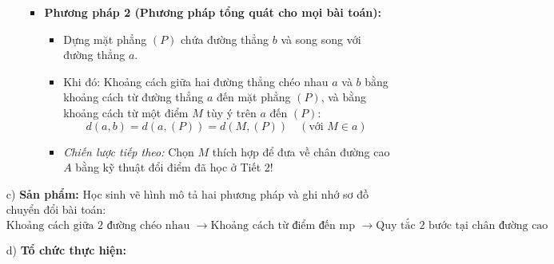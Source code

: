 \documentclass[12pt, a4paper]{article}
\begin{document}
\begin{itemize}[leftmargin=1.2cm]
\begin{itemize}[leftmargin=0.6cm]
\begin{itemize}
            \item \textbf{Phương pháp 2 (Phương pháp tổng quát cho mọi bài toán):}
            \begin{itemize}
                \item Dựng mặt phẳng $(P)$ chứa đường thẳng $b$ và song song với đường thẳng $a$.
                \item Khi đó: Khoảng cách giữa hai đường thẳng chéo nhau $a$ và $b$ bằng khoảng cách từ đường thẳng $a$ đến mặt phẳng $(P)$, và bằng khoảng cách từ một điểm $M$ tùy ý trên $a$ đến $(P)$:
                $$d(a, b) = d(a, (P)) = d(M, (P)) \quad (\text{với } M \in a)$$
                \item \textit{Chiến lược tiếp theo:} Chọn $M$ thích hợp để đưa về chân đường cao $A$ bằng kỹ thuật đổi điểm đã học ở Tiết 2!
            \end{itemize}
        \end{itemize}
    \end{itemize}

    \item[c)] \textbf{Sản phẩm:} Học sinh vẽ hình mô tả hai phương pháp và ghi nhớ sơ đồ chuyển đổi bài toán:
    $$\text{Khoảng cách giữa } 2 \text{ đường chéo nhau } \longrightarrow \text{Khoảng cách từ điểm đến mp } \longrightarrow \text{Quy tắc } 2 \text{ bước tại chân đường cao}$$
    \item[d)] \textbf{Tổ chức thực hiện:}
\end{itemize}
\end{document}
